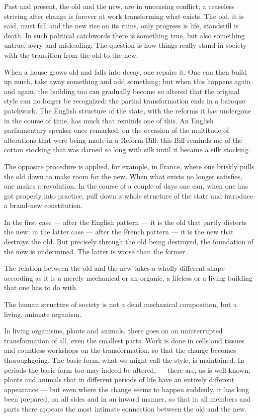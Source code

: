 \documentclass[12pt,a4paper,openany]{book}
\newcommand{\opage}[1]{\marginnote{\footnotesize\textit{[#1]}}}
\begin{document}
Past and present, the old and the new, are
in unceasing conflict; a ceaseless striving after
change is forever at work transforming what exists.
The old, it is said, must fall and the
\setcounter{footnote}{0}%
\opage{73}new rise on its ruins, only progress is life,
standstill is death. In such political catchwords there is
something true, but also something untrue, awry and misleading.
The question is how things really stand in society
with the transition from the old
to the new.

When a house grows old and falls into decay, one repairs
it. One can then build up much, take
away something and add something; but when this happens
again and again, the building too can gradually become
so altered that the original style can no longer be
recognized: the partial transformation ends in a baroque
patchwork. The English structure of the state, with the
reforms it has undergone in the course of time, has much
that reminds one of this. An English parliamentary speaker
once remarked, on the occasion of the multitude of
alterations that were being made in a Reform Bill:
this Bill reminds me of the cotton stocking that was
darned so long with silk until it became a silk stocking.


The opposite procedure is applied,
for example, in France, where one briskly
pulls the old down to make room for the new.
When what exists no longer satisfies, one makes
a revolution. In the course of a couple of days one can,
when one has got properly into practice, pull down a whole structure of the state
and introduce a brand-new constitution.

In the first case --- after the English pattern --- it is
the old that partly distorts the new; in the
latter case --- after the French pattern --- it is the
new that destroys the old. But precisely through the
\setcounter{footnote}{0}%
\opage{74}old being destroyed, the foundation of the
new is undermined. The latter is worse than the former.

The relation between the old and the new
takes a wholly different shape according as it is a merely mechanical
or an organic, a lifeless or a living building
that one has to do with.

The human structure of society is not a
dead mechanical composition, but a living, animate
organism.

In living organisms, plants and animals, there goes on
an uninterrupted transformation of all, even the
smallest parts. Work is done in cells and tissues and countless
workshops on the transformation, so that the change
becomes thoroughgoing. The basic form, what
we might call the style, is maintained. In periods the
basic form too may indeed be altered, --- there are, as is well known,
plants and animals that in different periods of life
have an entirely different appearance --- but even where
the change seems to happen suddenly, it has
long been prepared, on all sides and in an inward manner, so
that in all members and parts there appears the most intimate
connection between the old and the new.
\end{document}
